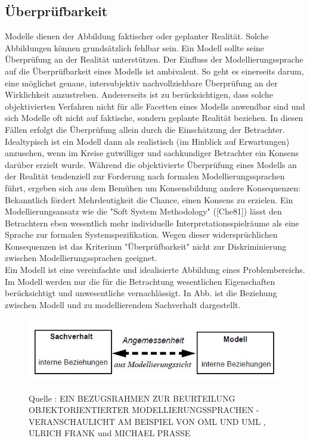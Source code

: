 \subsection{Überprüfbarkeit}
Modelle dienen der Abbildung faktischer oder geplanter Realität. Solche Abbildungen können grundsätzlich
fehlbar sein. Ein Modell sollte seine Überprüfung an der Realität unterstützen. Der Einfluss der
Modellierungssprache auf die Überprüfbarkeit eines Modells ist ambivalent. So geht es einerseits
darum, eine möglichst genaue, intersubjektiv nachvollziehbare Überprüfung an der Wirklichkeit anzustreben.
Andererseits ist zu berücksichtigen, dass solche objektivierten Verfahren nicht für alle Facetten
eines Modells anwendbar sind und sich Modelle oft nicht auf faktische, sondern geplante Realität
beziehen. In diesen Fällen erfolgt die Überprüfung allein durch die Einschätzung der Betrachter. Idealtypisch
ist ein Modell dann als realistisch (im Hinblick auf Erwartungen) anzusehen, wenn im Kreise
gutwilliger und sachkundiger Betrachter ein Konsens darüber erzielt wurde. Während die objektivierte
Überprüfung eines Modells an der Realität tendenziell zur Forderung nach formalen Modellierungssprachen
führt, ergeben sich aus dem Bemühen um Konsensbildung andere Konsequenzen: Bekanntlich
fördert Mehrdeutigkeit die Chance, einen Konsens zu erzielen. Ein Modellierungsansatz wie die
"Soft System Methodology" ([Che81]) lässt den Betrachtern eben wesentlich mehr individuelle Interpretationsspielräume
als eine Sprache zur formalen Systemspezifikation. Wegen dieser widersprüchlichen
Konsequenzen ist das Kriterium "Überprüfbarkeit" nicht zur Diskriminierung zwischen Modellierungssprachen
geeignet.\\
Ein Modell ist eine vereinfachte und idealisierte Abbildung eines Problembereichs. Im Modell werden
nur die für die Betrachtung wesentlichen Eigenschaften berücksichtigt und unwesentliche vernachlässigt.
In Abb.  ist die Beziehung zwischen Modell und zu modellierendem Sachverhalt dargestellt.
\begin{center}
	\begin{figure}[h]
		
		
		\includegraphics[scale=1]{Graphics/Sachverhalt.jpg}
		
		
		
		Quelle : EIN BEZUGSRAHMEN ZUR BEURTEILUNG OBJEKTORIENTIERTER MODELLIERUNGSSPRACHEN - VERANSCHAULICHT AM BEISPIEL VON OML UND UML , ULRICH FRANK und MICHAEL PRASSE
		
		
		
		\label{fig9}
		
		
	\end{figure}
	
\end{center}

